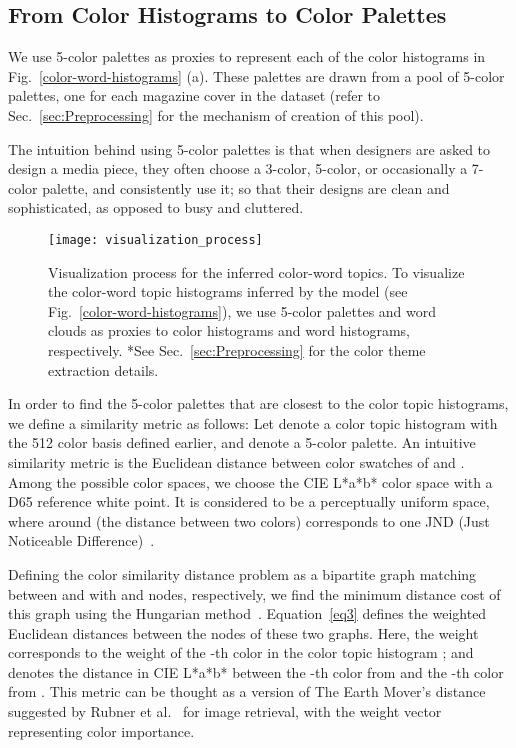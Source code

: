 \documentclass[prodmode,acmtochi]{acmsmall}
\begin{document}
\subsection{From Color Histograms to Color Palettes}

We use 5-color palettes as proxies to represent each of the color
histograms in Fig.~\ref{color-word-histograms} (a). These palettes
are drawn from a pool of 5-color palettes, one for each magazine cover in the dataset (refer to Sec.~\ref{sec:Preprocessing} for the mechanism of creation of this pool).

The intuition behind using 5-color palettes is that when designers are asked
to design a media piece, they often choose a 3-color, 5-color,
or occasionally a 7-color palette, and consistently use it; so
that their designs are clean and sophisticated, as opposed to
busy and cluttered.

\begin{figure}[h!tb]
  \centering
  \texttt{[image: visualization\_process]}
  \caption{Visualization process for the inferred color-word topics. To
    visualize the color-word topic histograms inferred by the model (see
    Fig.~\ref{color-word-histograms}), we use 5-color palettes and
    word clouds as proxies to color histograms and word histograms,
    respectively. *See Sec.~\ref{sec:Preprocessing} for the color theme extraction details.}
  \label{VisProcesses}
\end{figure}

In order to find the 5-color palettes that are closest to the color topic
histograms, we define a similarity metric as follows: Let 
denote a color topic histogram with the 512 color basis defined earlier, and 
denote a 5-color palette.  An intuitive similarity metric is the Euclidean
distance between color swatches of  and .  Among the
possible color spaces, we choose the CIE L*a*b* color space with a D65 reference white
point. It is considered to be a perceptually uniform space, where  around  (the distance between two colors) corresponds to one JND (Just Noticeable
Difference)~\cite{sharma2002digital:ch1}.

Defining the color similarity distance problem as a bipartite graph
matching between  and  with  and  nodes,
respectively, we find the minimum distance cost of this graph using the
Hungarian method~\cite{kuhn1955hungarian}.  Equation~\ref{eq3} defines
the weighted Euclidean distances  between the nodes of these two graphs.  Here, the
weight  corresponds to the weight of the -th color in the color
topic histogram ; and  denotes the distance in CIE L*a*b* between the -th color from  and the -th color from .
This metric can be thought as a version of
The Earth Mover's distance suggested by Rubner et
al.~\cite{rubner2000earth} for image retrieval, with the weight vector representing color importance.
\end{document}

